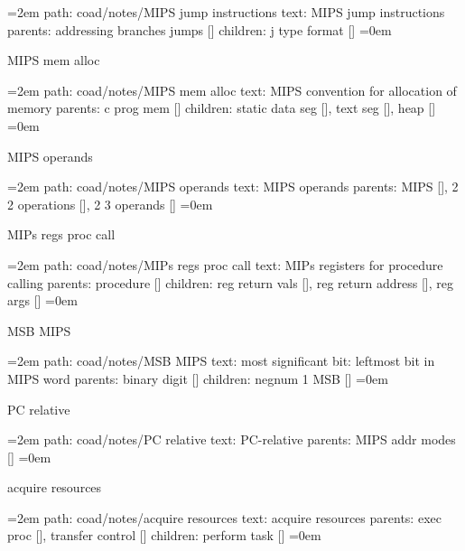 \leftskip=2em
path: coad/notes/MIPS jump instructions
\smallskip
text:  MIPS jump instructions
\smallskip
parents:  addressing branches jumps []
\smallskip
children: j type format []
\smallskip
\leftskip=0em
\par\endgroup
\bigskip
{}
MIPS mem alloc
\smallskip
\par\begingroup
\leftskip=2em
path: coad/notes/MIPS mem alloc
\smallskip
text:  MIPS convention for allocation of memory
\smallskip
parents:  c prog mem []
\smallskip
children: static data seg [], text seg [], heap []
\smallskip
\leftskip=0em
\par\endgroup
\bigskip
{}
MIPS operands
\smallskip
\par\begingroup
\leftskip=2em
path: coad/notes/MIPS operands
\smallskip
text:  MIPS operands
\smallskip
parents:  MIPS [], 2 2 operations [], 2 3 operands []
\smallskip
\leftskip=0em
\par\endgroup
\bigskip
{}
MIPs regs proc call
\smallskip
\par\begingroup
\leftskip=2em
path: coad/notes/MIPs regs proc call
\smallskip
text:  MIPs registers for procedure calling
\smallskip
parents:  procedure []
\smallskip
children: reg return vals [], reg return address [], reg args []
\smallskip
\leftskip=0em
\par\endgroup
\bigskip
{}
MSB MIPS
\smallskip
\par\begingroup
\leftskip=2em
path: coad/notes/MSB MIPS
\smallskip
text:  most significant bit: leftmost bit in MIPS word
\smallskip
parents:  binary digit []
\smallskip
children: negnum 1 MSB []
\smallskip
\leftskip=0em
\par\endgroup
\bigskip
{}
PC relative
\smallskip
\par\begingroup
\leftskip=2em
path: coad/notes/PC relative
\smallskip
text:  PC-relative
\smallskip
parents:  MIPS addr modes []
\smallskip
\leftskip=0em
\par\endgroup
\bigskip
{}
acquire resources
\smallskip
\par\begingroup
\leftskip=2em
path: coad/notes/acquire resources
\smallskip
text:  acquire resources
\smallskip
parents:  exec proc [], transfer control []
\smallskip
children: perform task []
\smallskip
\leftskip=0em
\par\endgroup
\bigskip
{}
